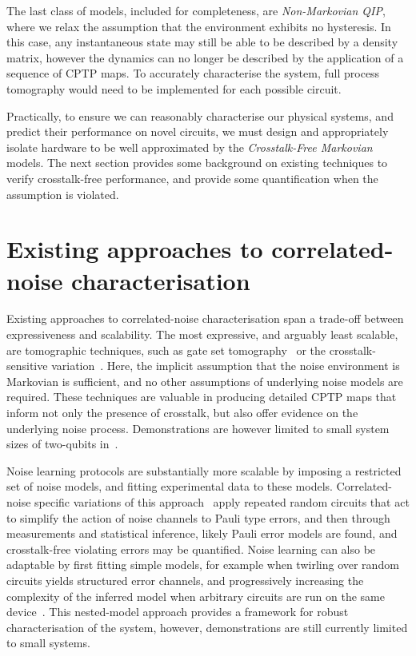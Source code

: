 The last class of models, included for completeness, are \emph{Non-Markovian QIP}, where we relax the assumption that the environment exhibits no hysteresis. In this case, any instantaneous state may still be able to be described by a density matrix, however the dynamics can no longer be described by the application of a sequence of CPTP maps. To accurately characterise the system, full process tomography would need to be implemented for each possible circuit.

Practically, to ensure we can reasonably characterise our physical systems, and predict their performance on novel circuits, we must design and appropriately isolate hardware to be well approximated by the \emph{Crosstalk-Free Markovian} models. The next section provides some background on existing techniques to verify crosstalk-free performance, and provide some quantification when the assumption is violated.


\section{Existing approaches to correlated-noise characterisation}
\label{sec:existing_approaches}

Existing approaches to correlated-noise characterisation span a trade-off
between expressiveness and scalability. The most expressive, and arguably least scalable, are tomographic techniques, such as gate set tomography~\cite{nielsen_gate_2021} or the crosstalk-sensitive variation~\cite{rudinger_experimental_2021}. Here, the implicit assumption that the noise environment is Markovian is sufficient, and no other assumptions of underlying noise models are required. These techniques are valuable in producing detailed CPTP maps that inform not only the presence of crosstalk, but also offer evidence on the underlying noise process. Demonstrations are however limited to small system sizes of two-qubits in~\cite{rudinger_experimental_2021}.

Noise learning protocols are substantially more scalable by imposing a restricted set of noise models, and fitting experimental data to these models. Correlated-noise specific variations of this approach~\cite{harper_efficient_2020,harper_learning_2023} apply repeated random circuits that act to simplify the action of noise channels to Pauli type errors, and then through measurements and statistical inference, likely Pauli error models are found, and crosstalk-free violating errors may be quantified. Noise learning can also be adaptable by first fitting simple models, for example when twirling over random circuits yields structured error channels, and progressively increasing the complexity of the inferred model when arbitrary circuits are run on the same device~\cite{nielsen_efficient_2021}. This nested-model approach provides a framework for robust characterisation of the system, however, demonstrations are still currently limited to small systems. 

